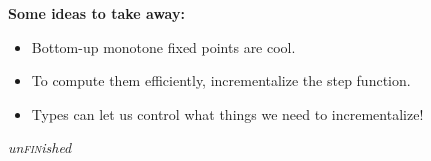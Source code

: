 \documentclass[aspectratio=169,dvipsnames]{beamer}
\providecommand\strong[1]{{\bfseries#1}}
\newcommand\D\Delta
\newcommand\fn{\ensuremath{\lambda}}
\newcommand\isa{\mathrel{\,\text{:}\,}}
\newcommand\tset{\tpname{Set}~}
\newcommand\hilite{\color{Rhodamine}}
\newcommand\hi[1]{{\hilite#1}}
\begin{document}
  \begin{frame}
    \strong{Some ideas to take away:}
    \begin{itemize}
    \item Bottom-up monotone fixed points are cool.
    \item To compute them efficiently, incrementalize the step function.
    \item Types can let us control what things we need to incrementalize!\\
    \end{itemize}
  \end{frame}
  \begin{frame}\centering\Huge\color{gray!10}\itshape un{\upshape\scshape\color{black}fin}ished\end{frame}


  
  
  
\end{document}
